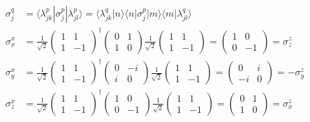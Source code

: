 \documentclass[a4paper,12pt]{article}
\newcommand{\brak}{}
\newcommand{\braket}{}
\begin{document}
\begin{align*}
\sigma_j^q&=\braket\langle {\lambda_{jk}^p} | {\sigma_j^p} | {\lambda_{jl}^p}\rangle=\brak\langle {\lambda_{jk}^q}| {n}\rangle\braket\langle {n} | {\sigma_j^p} | {m}\rangle\brak\langle {m}| {\lambda_{jl}^q}\rangle\\
\sigma_x^x&=\frac{1}{\sqrt{2}}\begin{pmatrix}
1 & 1 \\ 1 & -1
\end{pmatrix}^\dagger \begin{pmatrix}
0 & 1 \\ 1 & 0
\end{pmatrix}\frac{1}{\sqrt{2}}\begin{pmatrix}
1 & 1 \\ 1 & -1
\end{pmatrix}= \begin{pmatrix}
1 & 0 \\ 0 & -1
\end{pmatrix}=\sigma_z^z\\
\sigma_y^x&=\frac{1}{\sqrt{2}}\begin{pmatrix}
1 & 1 \\ 1 & -1
\end{pmatrix}^\dagger \begin{pmatrix}
0 & -i \\ i & 0
\end{pmatrix}\frac{1}{\sqrt{2}}\begin{pmatrix}
1 & 1 \\ 1 & -1
\end{pmatrix}= \begin{pmatrix}
0 & i \\ -i & 0
\end{pmatrix}=-\sigma_y^z\\
\sigma_z^x&=\frac{1}{\sqrt{2}}\begin{pmatrix}
1 & 1 \\ 1 & -1
\end{pmatrix}^\dagger \begin{pmatrix}
1 & 0 \\ 0 & -1
\end{pmatrix}\frac{1}{\sqrt{2}}\begin{pmatrix}
1 & 1 \\ 1 & -1
\end{pmatrix}= \begin{pmatrix}
0 & 1 \\ 1 & 0
\end{pmatrix}=\sigma_x^z\\

\end{align*}
\end{document}
